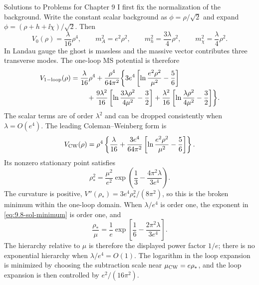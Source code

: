\begin{bankssolutions}{Solutions to Problems for Chapter 9}
I first fix the normalization of the background.  Write the constant scalar
background as $\phi=\rho/\sqrt2$ and expand
$\phi=(\rho+h+\ii\chi)/\sqrt2$.  Then
\[
 V_0(\rho)=\frac{\lambda}{16}\rho^4,
 \qquad m_A^2=e^2\rho^2,
 \qquad m_h^2=\frac{3\lambda}{4}\rho^2,
 \qquad m_\chi^2=\frac{\lambda}{4}\rho^2.
\]
In Landau gauge the ghost is massless and the massive vector contributes
three transverse modes.  The one-loop MS potential is therefore
\begin{align}
 V_{\rm 1-loop}(\rho)={}&\frac{\lambda}{16}\rho^4
 +\frac{\rho^4}{64\pi^2}\biggl\{
 3e^4\left[\ln\frac{e^2\rho^2}{\mu^2}-\frac56\right]
 \nonumber\\
 &\quad+\frac{9\lambda^2}{16}
 \left[\ln\frac{3\lambda\rho^2}{4\mu^2}-\frac32\right]
 +\frac{\lambda^2}{16}
 \left[\ln\frac{\lambda\rho^2}{4\mu^2}-\frac32\right]
 \biggr\}. \label{eq:9.8-sol-veff}
\end{align}
The scalar terms are of order $\lambda^2$ and can be dropped consistently
when $\lambda=O(e^4)$.  The leading Coleman--Weinberg form is
\[
 V_{\rm CW}(\rho)=\rho^4\left\{
 \frac{\lambda}{16}+
 \frac{3e^4}{64\pi^2}
 \left[\ln\frac{e^2\rho^2}{\mu^2}-\frac56\right]
 \right\}.
\]
Its nonzero stationary point satisfies
\begin{equation}
 \rho_*^2=\frac{\mu^2}{e^2}
 \exp\left(\frac13-\frac{4\pi^2\lambda}{3e^4}\right).
 \label{eq:9.8-sol-minimum}
\end{equation}
The curvature is positive,
$V''(\rho_*)=3e^4\rho_*^2/(8\pi^2)$, so this is the broken minimum
within the one-loop domain.  When $\lambda/e^4$ is order one, the exponent
in \eqref{eq:9.8-sol-minimum} is order one, and
\[
 \frac{\rho_*}{\mu}=\frac1e\exp\left[
 \frac16-\frac{2\pi^2\lambda}{3e^4}\right].
\]
The hierarchy relative to $\mu$ is therefore the displayed power factor
$1/e$; there is no exponential hierarchy when $\lambda/e^4=O(1)$.  The
logarithm in the loop expansion is minimized by choosing the subtraction
scale near $\mu_{\rm CW}=e\rho_*$, and the loop expansion is then controlled
by $e^2/(16\pi^2)$.


\end{bankssolutions}
